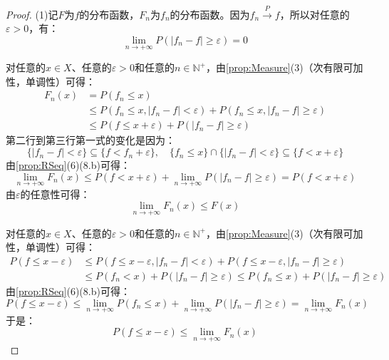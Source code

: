 \begin{proof}
	(1)记$F$为$f$的分布函数，$F_n$为$f_n$的分布函数。因为$f_n\overset{P}{\longrightarrow}f$，所以对任意的$\varepsilon>0$，有：
	\begin{equation*}
		\lim_{n\to+\infty}P(|f_n-f|\geqslant\varepsilon)=0
	\end{equation*}\par
	对任意的$x\in X$、任意的$\varepsilon>0$和任意的$n\in \mathbb{N}^+$，由\cref{prop:Measure}(3)（次有限可加性，单调性）可得：
	\begin{align*}
		F_n(x)&=P(f_n\leqslant x) \\
		&\leqslant P(f_n\leqslant x,|f_n-f|<\varepsilon)+P(f_n\leqslant x,|f_n-f|\geqslant\varepsilon) \\
		&\leqslant P(f\leqslant x+\varepsilon)+P(|f_n-f|\geqslant\varepsilon)
	\end{align*}
	第二行到第三行第一式的变化是因为：
	\begin{equation*}
		\{|f_n-f|<\varepsilon\}\subseteq\{f<f_n+\varepsilon\},\quad\{f_n\leqslant x\}\cap\{|f_n-f|<\varepsilon\}\subseteq\{f<x+\varepsilon\}
	\end{equation*}
	由\cref{prop:RSeq}(6)(8.b)可得：
	\begin{equation*}
		\lim_{n\to+\infty}F_n(x)\leqslant P(f<x+\varepsilon)+\lim_{n\to+\infty}P(|f_n-f|\geqslant\varepsilon)=P(f<x+\varepsilon)
	\end{equation*}
	由$\varepsilon$的任意性可得：
	\begin{equation*}
		\lim_{n\to+\infty}F_n(x)\leqslant F(x)
	\end{equation*}\par
	对任意的$x\in X$、任意的$\varepsilon>0$和任意的$n\in \mathbb{N}^+$，由\cref{prop:Measure}(3)（次有限可加性，单调性）可得：
	\begin{align*}
		P(f\leqslant x-\varepsilon)&\leqslant P(f\leqslant x-\varepsilon,|f_n-f|<\varepsilon)+P(f\leqslant x-\varepsilon,|f_n-f|\geqslant \varepsilon) \\
		&\leqslant P(f_n<x)+P(|f_n-f|\geqslant\varepsilon)\leqslant P(f_n\leqslant x)+P(|f_n-f|\geqslant\varepsilon)
	\end{align*}
	由\cref{prop:RSeq}(6)(8.b)可得：
	\begin{equation*}
		P(f\leqslant x-\varepsilon)\leqslant\lim_{n\to+\infty}P(f_n\leqslant x)+\lim_{n\to+\infty}P(|f_n-f|\geqslant\varepsilon)=\lim_{n\to+\infty}F_n(x)
	\end{equation*}
	于是：
	\begin{equation*}
		P(f\leqslant x-\varepsilon)\leqslant\lim_{n\to+\infty}F_n(x)

\end{equation*}
\end{proof}
